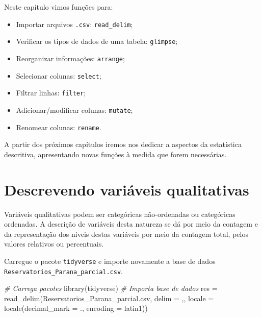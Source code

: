 \documentclass[
]{book}
\newenvironment{Shaded}{\begin{snugshade}}{\end{snugshade}}
\newcommand{\AttributeTok}[1]{\textcolor[rgb]{0.77,0.63,0.00}{#1}}
\newcommand{\CommentTok}[1]{\textcolor[rgb]{0.56,0.35,0.01}{\textit{#1}}}
\newcommand{\FunctionTok}[1]{\textcolor[rgb]{0.00,0.00,0.00}{#1}}
\newcommand{\NormalTok}[1]{#1}
\newcommand{\OtherTok}[1]{\textcolor[rgb]{0.56,0.35,0.01}{#1}}
\newcommand{\StringTok}[1]{\textcolor[rgb]{0.31,0.60,0.02}{#1}}
\begin{document}
Neste capítulo vimos funções para:

\begin{itemize}
\item
  Importar arquivos \texttt{.csv}: \texttt{read\_delim};
\item
  Verificar os tipos de dados de uma tabela: \texttt{glimpse};
\item
  Reorganizar informações: \texttt{arrange};
\item
  Selecionar colunas: \texttt{select};
\item
  Filtrar linhas: \texttt{filter};
\item
  Adicionar/modificar colunas: \texttt{mutate};
\item
  Renomear colunas: \texttt{rename}.
\end{itemize}

A partir dos próximos capítulos iremos nos dedicar a aspectos da estatística descritiva, apresentando novas funções à medida que forem necessárias.

\hypertarget{varqualit}{%
\chapter{Descrevendo variáveis qualitativas}\label{varqualit}}

Variáveis qualitativas podem ser categóricas não-ordenadas ou categóricas ordenadas. A descrição de variáveis desta natureza se dá por meio da contagem e da representação dos níveis destas variáveis por meio da contagem total, pelos valores relativos ou percentuais.

Carregue o pacote \texttt{tidyverse} e importe novamente a base de dados \texttt{Reservatorios\_Parana\_parcial.csv}.

\begin{Shaded}
\begin{Highlighting}[]
\CommentTok{\# Carrega pacotes}
\FunctionTok{library}\NormalTok{(tidyverse)}
\CommentTok{\# Importa base de dados }
\NormalTok{res }\OtherTok{=} \FunctionTok{read\_delim}\NormalTok{(}\StringTok{\textquotesingle{}Reservatorios\_Parana\_parcial.csv\textquotesingle{}}\NormalTok{,}
                  \AttributeTok{delim =} \StringTok{\textquotesingle{},\textquotesingle{}}\NormalTok{,}
                  \AttributeTok{locale =} \FunctionTok{locale}\NormalTok{(}\AttributeTok{decimal\_mark =} \StringTok{\textquotesingle{}.\textquotesingle{}}\NormalTok{,}
                                  \AttributeTok{encoding =} \StringTok{\textquotesingle{}latin1\textquotesingle{}}\NormalTok{))}
\end{Highlighting}
\end{Shaded}
\end{document}
